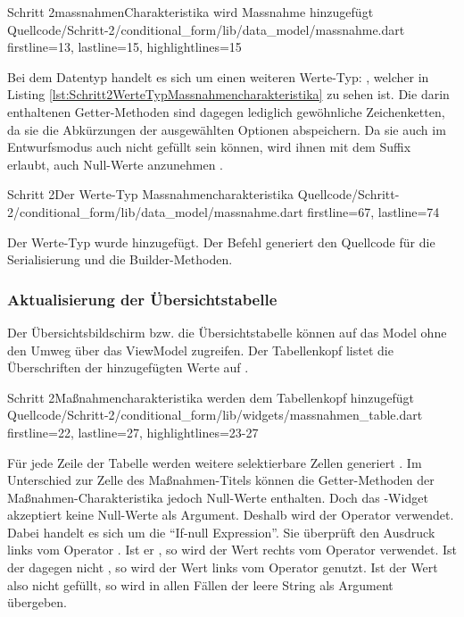 \begin{alexlisting}{Schritt 2}{massnahmenCharakteristika wird Massnahme hinzugefügt}
  {Quellcode/Schritt-2/conditional_form/lib/data_model/massnahme.dart}
  {firstline=13, lastline=15, highlightlines={15}}
  \label{lst:Schritt2massnahmenCharakteristikaWirdMMassnahmeHinzugefuegt}
\end{alexlisting}

Bei dem Datentyp handelt es sich um einen weiteren Werte-Typ: , welcher in Listing \ref{lst:Schritt2WerteTypMassnahmencharakteristika} zu sehen ist.
Die darin enthaltenen Getter-Methoden sind dagegen lediglich gewöhnliche Zeichenketten, da sie die Abkürzungen der ausgewählten Optionen abspeichern.
Da sie auch im Entwurfsmodus auch nicht gefüllt sein können, wird ihnen mit dem Suffix  erlaubt, auch Null-Werte anzunehmen .

\begin{alexlisting}{Schritt 2}{Der Werte-Typ Massnahmencharakteristika}
  {Quellcode/Schritt-2/conditional_form/lib/data_model/massnahme.dart}
  {firstline=67, lastline=74}
  \label{lst:Schritt2WerteTypMassnahmencharakteristika}
\end{alexlisting}

Der Werte-Typ wurde hinzugefügt.
Der Befehl  generiert den Quellcode für die Serialisierung und die Builder-Methoden.

\subsubsection{Aktualisierung der Übersichtstabelle}

Der Übersichtsbildschirm bzw. die Übersichtstabelle können auf das Model ohne den Umweg über das ViewModel zugreifen. Der Tabellenkopf listet die Überschriften der hinzugefügten Werte auf . 

\begin{alexlisting}{Schritt 2}{Maßnahmencharakteristika werden dem Tabellenkopf hinzugefügt}
  {Quellcode/Schritt-2/conditional_form/lib/widgets/massnahmen_table.dart}
  {firstline=22, lastline=27, highlightlines={23-27}}
  \label{lst:Schritt2MassnahmencharakteristikaEerdenDemTabellenkopfHinzugefuegt}
\end{alexlisting}

Für jede Zeile der Tabelle werden weitere selektierbare Zellen generiert . Im Unterschied zur Zelle des Maßnahmen-Titels können die Getter-Methoden der Maßnahmen-Charakteristika jedoch Null-Werte enthalten.
Doch das -Widget akzeptiert keine Null-Werte als Argument. Deshalb wird der Operator  verwendet. Dabei handelt es sich um die \enquote{If-null Expression}. 
Sie überprüft den Ausdruck links vom Operator . Ist er , so wird der Wert rechts vom Operator verwendet.
Ist der dagegen nicht , so wird der Wert links vom Operator  genutzt.  Ist der Wert also nicht gefüllt, so wird in allen Fällen der leere String  als Argument übergeben.

